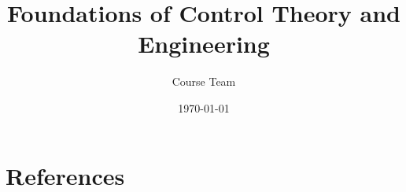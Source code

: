 

\title{Foundations of Control Theory and Engineering}
\author{Course Team}
\date{\today}


\maketitle
\tableofcontents











\appendix



\chapter*{References}
\printbibliography



